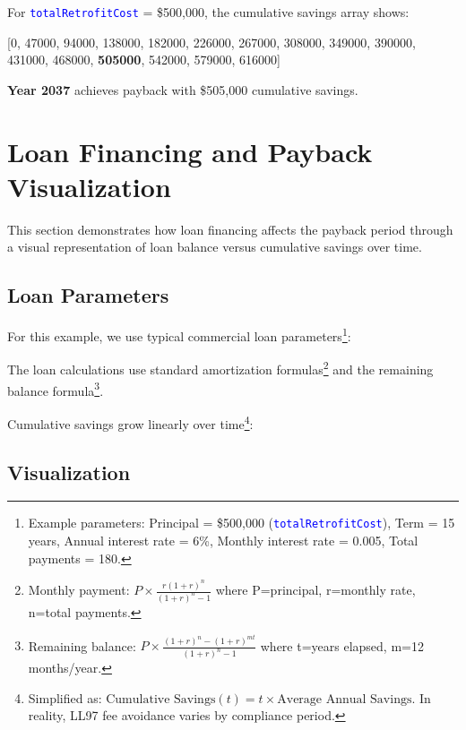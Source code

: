 \documentclass{article}
\newcommand{\code}[1]{\textcolor{blue}{\texttt{#1}}}
\begin{document}
For \code{totalRetrofitCost} = \$500,000, the cumulative savings array shows:

[0, 47000, 94000, 138000, 182000, 226000, 267000, 308000, 349000, 390000, 431000, 468000, \textbf{505000}, 542000, 579000, 616000]

\textbf{Year 2037} achieves payback with \$505,000 cumulative savings.

\section{Loan Financing and Payback Visualization}

This section demonstrates how loan financing affects the payback period through a visual representation of loan balance versus cumulative savings over time.

\subsection{Loan Parameters}

For this example, we use typical commercial loan parameters\footnote{Example parameters: Principal = \$500,000 (\code{totalRetrofitCost}), Term = 15 years, Annual interest rate = 6\%, Monthly interest rate = 0.005, Total payments = 180.}:

The loan calculations use standard amortization formulas\footnote{Monthly payment: $P \times \frac{r(1+r)^n}{(1+r)^n-1}$ where P=principal, r=monthly rate, n=total payments.} and the remaining balance formula\footnote{Remaining balance: $P \times \frac{(1+r)^n-(1+r)^{mt}}{(1+r)^n-1}$ where t=years elapsed, m=12 months/year.}. 

Cumulative savings grow linearly over time\footnote{Simplified as: $\text{Cumulative Savings}(t) = t \times \text{Average Annual Savings}$. In reality, LL97 fee avoidance varies by compliance period.}:

\subsection{Visualization}
\end{document}
